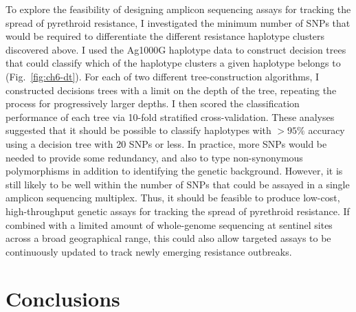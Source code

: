 \begin{refsection}
To explore the feasibility of designing amplicon sequencing assays for tracking the spread of pyrethroid resistance, I investigated the minimum number of SNPs that would be required to differentiate the different resistance haplotype clusters discovered above.
%
I used the Ag1000G haplotype data to construct decision trees that could classify which of the haplotype clusters a given haplotype belongs to (Fig.~\ref{fig:ch6-dt}).
%
For each of two different tree-construction algorithms, I constructed decisions trees with a limit on the depth of the tree, repeating the process for progressively larger depths.
%
I then scored the classification performance of each tree via 10-fold stratified cross-validation.
%
These analyses suggested that it should be possible to classify haplotypes with $>95\%$ accuracy using a decision tree with 20 SNPs or less.
%
In practice, more SNPs would be needed to provide some redundancy, and also to type non-synonymous polymorphisms in addition to identifying the genetic background.
%
However, it is still likely to be well within the number of SNPs that could be assayed in a single amplicon sequencing multiplex.
%
Thus, it should be feasible to produce low-cost, high-throughput genetic assays for tracking the spread of pyrethroid resistance.
%
If combined with a limited amount of whole-genome sequencing at sentinel sites across a broad geographical range, this could also allow targeted assays to be continuously updated to track newly emerging resistance outbreaks.



\section{Conclusions}\label{sec:ch6-conclusions}



\end{refsection}
